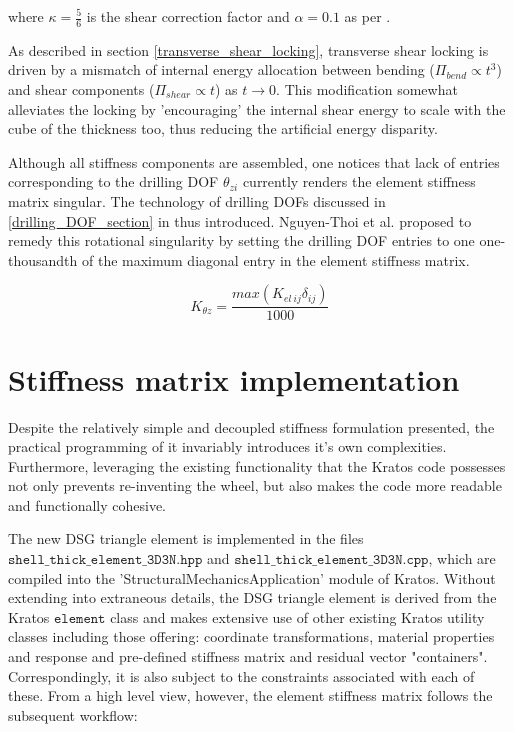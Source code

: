 where $\kappa = \frac{5}{6}$ is the shear correction factor and $\alpha = 0.1$ as per \cite{Lyl93}.

As described in section \ref{transverse_shear_locking}, transverse shear locking is driven by a mismatch of internal energy allocation between bending ($\Pi_{bend} \propto t^3$) and shear components ($\Pi_{shear} \propto t$) as $t \rightarrow 0$.  This modification somewhat alleviates the locking by 'encouraging' the internal shear energy to scale with the cube of the thickness too, thus reducing the artificial energy disparity.

Although all stiffness components are assembled, one notices that lack of entries corresponding to the drilling DOF $\theta_{zi}$ currently renders the element stiffness matrix singular. The technology of drilling DOFs discussed in \ref{drilling_DOF_section} in thus introduced. Nguyen-Thoi et al. \cite{Ngu13} proposed to remedy this rotational singularity by setting the drilling DOF entries to one one-thousandth of the maximum diagonal entry in the element stiffness matrix.

\begin{equation} 
K_{\theta z} =  \frac{max(K_{el\ ij}\delta_{ij})}{1000}
\label{eqtdrilling}
\end{equation}




\section{Stiffness matrix implementation}
Despite the relatively simple and decoupled stiffness formulation presented, the practical programming of it invariably introduces it's own complexities. Furthermore, leveraging the existing functionality that the Kratos code possesses not only prevents re-inventing the wheel, but also makes the code more readable and functionally cohesive.  

The new DSG triangle element is implemented in the files $\texttt{shell\_thick\_element\_3D3N.hpp}$ and $\texttt{shell\_thick\_element\_3D3N.cpp}$, which are compiled into the  'StructuralMechanicsApplication' module of Kratos. Without extending into extraneous details, the DSG triangle element is derived from the Kratos $\texttt{element}$ class and makes extensive use of other existing Kratos utility classes including those offering: coordinate transformations, material properties and response and pre-defined stiffness matrix and residual vector "containers". Correspondingly, it is also subject to the constraints associated with each of these. From a high level view, however, the element stiffness matrix follows the subsequent workflow:

